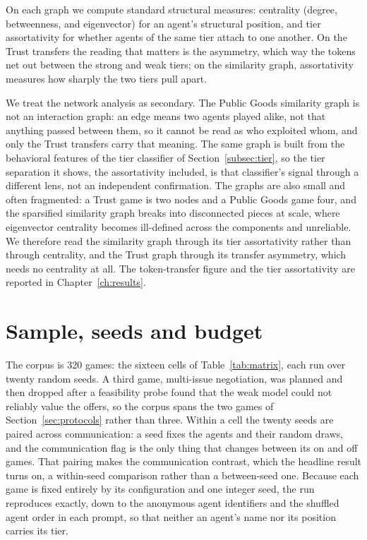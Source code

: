 On each graph we compute standard structural measures: centrality (degree,
betweenness, and eigenvector) for an agent's structural position, and tier
assortativity for whether agents of the same tier attach to one another. On the Trust transfers the reading that
matters is the asymmetry, which way the tokens net out between the strong and weak
tiers; on the similarity graph, assortativity measures how sharply the two tiers
pull apart.

We treat the network analysis as secondary. The Public Goods similarity graph is
not an interaction graph: an
edge means two agents played alike, not that anything passed between them, so it
cannot be read as who exploited whom, and only the Trust transfers carry that
meaning. The same graph is built from the behavioral features of the tier
classifier of Section~\ref{subsec:tier}, so the tier separation it shows, the
assortativity included, is that classifier's signal through a different lens, not
an independent confirmation. The graphs are also small and often fragmented: a
Trust game is two nodes and a Public Goods game four, and the sparsified
similarity graph breaks into disconnected pieces at scale, where eigenvector
centrality becomes ill-defined across the components and unreliable. We therefore
read the similarity graph through its tier assortativity rather than through
centrality, and the Trust graph through its transfer asymmetry, which needs no
centrality at all. The token-transfer figure and the tier assortativity are
reported in Chapter~\ref{ch:results}.

\section{Sample, seeds and budget}
\label{sec:sample}

The corpus is 320 games: the sixteen cells of Table~\ref{tab:matrix}, each run over
twenty random seeds. A third game, multi-issue negotiation, was planned and then
dropped after a feasibility probe found that the weak model could not reliably
value the offers, so the corpus spans the two games of
Section~\ref{sec:protocols} rather than three. Within a cell the twenty seeds are
paired across communication: a seed fixes the agents and their random draws, and
the communication flag is the only thing that changes between its on and off
games. That pairing makes the communication contrast, which the headline result
turns on, a within-seed comparison rather than a between-seed one. Because each game is fixed entirely by its configuration and one integer seed, the run
reproduces exactly, down to the anonymous agent identifiers and the shuffled agent
order in each prompt, so that neither an agent's name nor its position carries its
tier.

